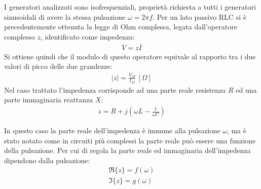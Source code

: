 \documentclass{article}
\numberwithin{equation}{subsection}
\begin{document}
I generatori analizzati sono isofrequenziali, proprietà richiesta a tutti i generatori sinusoidali di avere la stessa pulsazione $\omega=2\pi f$. 
Per un lato passivo RLC si è precedentemente ottenuta la legge di Ohm complessa, legata dall'operatore complesso $z$, identificato come impedenza: 
\begin{gather*}
    \overline V=z\overline I
\end{gather*}
Si ottiene quindi che il modulo di questo operatore equivale al rapporto tra i due valori di picco delle due grandezze:
\begin{gather*}
    |z|=\displaystyle\frac{V_M}{I_M}\,[\Omega]
\end{gather*}
Nel caso trattato l'impedenza corrisponde ad una parte reale resistenza $R$ ed una parte immaginaria reattanza $X$:
\begin{gather*}
    z=R+j\left(\displaystyle\omega L-\frac{1}{\omega C}\right)
\end{gather*}

In questo caso la parte reale dell'impedenza è immune alla pulsazione $\omega$, ma è stato notato come in circuiti più complessi la parte reale può essere una funzione della 
pulsazione. Per cui di regola la parte reale ed immaginaria dell'impedenza dipendono dalla pulsazione:
\begin{gather*}
    \Re\{z\}=f(\omega)\\
    \Im\{z\}=g(\omega)
\end{gather*}
\end{document}
